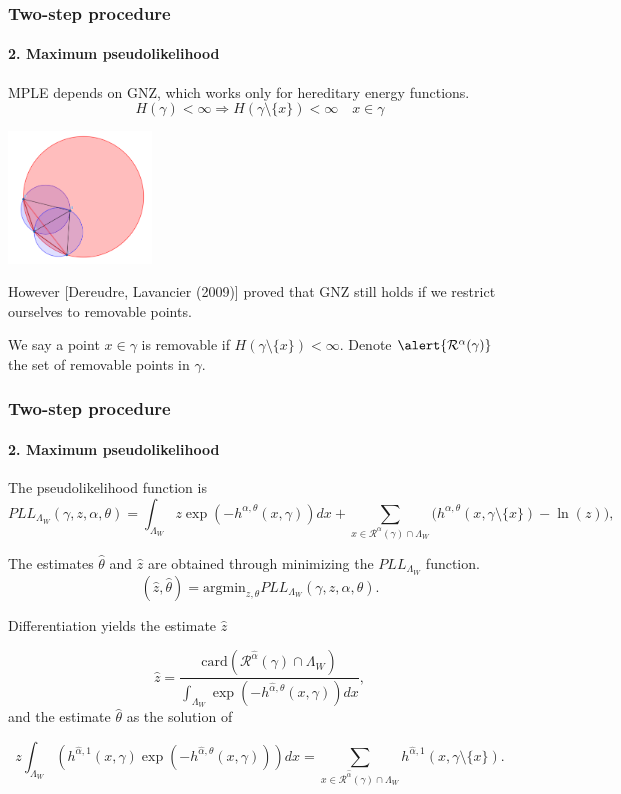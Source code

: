 \documentclass[c, 10pt]{beamer}
\begin{document}
\begin{frame}\frametitle{Two-step procedure}\framesubtitle{2. Maximum pseudolikelihood}
MPLE depends on GNZ, which works only for \alert{hereditary} energy functions.
$$H(\gamma) < \infty \Rightarrow H(\gamma \setminus \{x\}) < \infty \quad x \in \gamma$$

\begin{center}
\includegraphics[height = 3.5cm]{./FigureLayout/hereditarity.png}
\end{center}
\pause
However [Dereudre, Lavancier (2009)] proved that GNZ still holds if we restrict ourselves to \alert{removable points}.\newline

We say a point $x\in \gamma$ is removable if $H(\gamma \setminus \{x\}) < \infty$. Denote $\alert {\mathcal R^\alpha(\gamma)}$ the set of removable points in $\gamma$. 


\end{frame}

\begin{frame}\frametitle{Two-step procedure}\framesubtitle{2. Maximum pseudolikelihood}
\begin{small}
The pseudolikelihood function is
$$ PLL_{\Lambda_W}(\gamma,z,\alpha, \theta) = \int_{\Lambda_W } z \exp (-h^{\alpha,\theta}(x,\gamma)) dx + \sum_{x\in\mathcal R^\alpha(\gamma)\cap \Lambda_W } \big(h^{\alpha,\theta}(x,\gamma\setminus\{x\}) - \ln(z)\big),
$$


The estimates $\hat\theta$ and $\hat z$ are obtained through minimizing the $PLL_{\Lambda_W }$ function. 
$$(\hat z, \hat\theta) = \text{argmin}_{z,\theta} PLL_{\Lambda_W } (\gamma, z, \hat\alpha,\theta).$$

\pause
Differentiation yields the estimate $\hat z$ 

$$\hat z = \frac{\mbox{card}(\mathcal R^{\hat\alpha}(\gamma)\cap \Lambda_W)}{\int_{\Lambda_W} \exp{\left( -h^{\hat\alpha,\theta}(x,\gamma)\right)} dx},$$
\pause
and the estimate $\hat\theta$ as the solution of

$$z \int_{\Lambda_W} (h^{\hat\alpha,1}(x,\gamma)\exp{\left(-h^{\hat\alpha,\theta}(x,\gamma)\right)}) dx = \sum_{x \in \mathcal R^{\hat\alpha}(\gamma)\cap \Lambda_W} h^{\hat\alpha,1}(x,\gamma\setminus\{x\}).$$

\end{small}
\end{frame}
\end{document}
